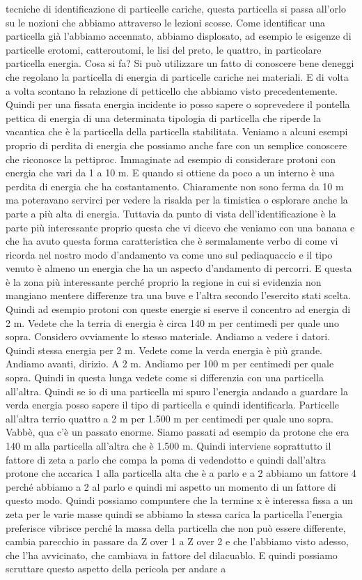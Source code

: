{tecniche di identificazione di particelle cariche, questa particella si passa all'orlo su le nozioni che abbiamo attraverso le lezioni scosse. Come identificar una particella già l'abbiamo accennato, abbiamo displosato, ad esempio le esigenze di particelle erotomi, catteroutomi, le lisi del preto, le quattro, in particolare particella energia. Cosa si fa? Si può utilizzare un fatto di conoscere bene deneggi che regolano la particella di energia di particelle cariche nei materiali. E di volta a volta scontano la relazione di petticello che abbiamo visto precedentemente. Quindi per una fissata energia incidente io posso sapere o soprevedere il pontella pettica di energia di una determinata tipologia di particella che riperde la vacantica che è la particella della particella stabilitata. Veniamo a alcuni esempi proprio di perdita di energia che possiamo anche fare con un semplice conoscere che riconosce la pettiproc. Immaginate ad esempio di considerare protoni con energia che vari da 1 a 10 m. E quando si ottiene da poco a un interno è una perdita di energia che ha costantamento. Chiaramente non sono ferma da 10 m ma poteravano servirci per vedere la risalda per la timistica o esplorare anche la parte a più alta di energia. Tuttavia da punto di vista dell'identificazione è la parte più interessante proprio questa che vi dicevo che veniamo con una banana e che ha avuto questa forma caratteristica che è sermalamente verbo di come vi ricorda nel nostro modo d'andamento va come uno sul pediaquaccio e il tipo venuto è almeno un energia che ha un aspecto d'andamento di percorri. E questa è la zona più interessante perché proprio la regione in cui si evidenzia non mangiano mentere differenze tra una buve e l'altra secondo l'esercito stati scelta. Quindi ad esempio protoni con queste energie si eserve il concentro ad energia di 2 m. Vedete che la terria di energia è circa 140 m per centimedi per quale uno sopra. Considero ovviamente lo stesso materiale. Andiamo a vedere i datori. Quindi stessa energia per 2 m. Vedete come la verda energia è più grande. Andiamo avanti, dirizio. A 2 m. Andiamo per 100 m per centimedi per quale sopra. Quindi in questa lunga vedete come si differenzia con una particella all'altra. Quindi se io di una particella mi spuro l'energia andando a guardare la verda energia posso sapere il tipo di particella e quindi identificarla. Particelle all'altra terrio quattro a 2 m per 1.500 m per centimedi per quale uno sopra. Vabbè, qua c'è un passato enorme. Siamo passati ad esempio da protone che era 140 m alla particella all'altra che è 1.500 m. Quindi interviene soprattutto il fattore di zeta a parlo che compa la poma di vedendotto e quindi dall'altra protone che accarica 1 alla particella alta che è a parlo e a 2 abbiamo un fattore 4 perché abbiamo a 2 al parlo e quindi mi aspetto un momento di un fattore di questo modo. Quindi possiamo compuntere che la termine x è interessa fissa a un zeta per le varie masse quindi se abbiamo la stessa carica la particella l'energia preferisce vibrisce perché la massa della particella che non può essere differente, cambia parecchio in passare da Z over 1 a Z over 2 e che l'abbiamo visto adesso, che l'ha avvicinato, che cambiava in fattore del dilacuablo. E quindi possiamo scruttare questo aspetto della pericola per andare a }

